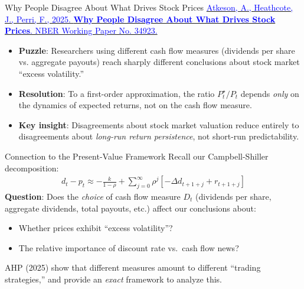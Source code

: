 \documentclass{beamer}
\begin{document}
\begin{frame}{Why People Disagree About What Drives Stock Prices}
	\href{https://www.nber.org/papers/w34923}{\textcolor{blue}{Atkeson, A., Heathcote, J., Perri, F., 2025. \textbf{Why People Disagree About What Drives Stock Prices}. NBER Working Paper No. 34923.}}
	\begin{itemize}
		\item \textbf{Puzzle}: Researchers using different cash flow measures (dividends per share vs. aggregate payouts) reach sharply different conclusions about stock market ``excess volatility.''
		\item \textbf{Resolution}: To a first-order approximation, the ratio $P^\star_t / P_t$ depends \textit{only} on the dynamics of expected returns, not on the cash flow measure.
		\item \textbf{Key insight}: Disagreements about stock market valuation reduce entirely to disagreements about \textit{long-run return persistence}, not short-run predictability.
	\end{itemize}
\end{frame}

\begin{frame}{Connection to the Present-Value Framework}
	Recall our Campbell-Shiller decomposition:
	\begin{align*}
		d_t - p_t \approx -\frac{k}{1-\rho} + \sum_{j=0}^{\infty} \rho^j \left[-\Delta d_{t+1+j} + r_{t+1+j}\right]
	\end{align*}
	\textbf{Question}: Does the \textit{choice} of cash flow measure $D_t$ (dividends per share, aggregate dividends, total payouts, etc.) affect our conclusions about:
	\begin{itemize}
		\item Whether prices exhibit ``excess volatility''?
		\item The relative importance of discount rate vs.\ cash flow news?
	\end{itemize}
	AHP (2025) show that different measures amount to different ``trading strategies,'' and provide an \textit{exact} framework to analyze this.
\end{frame}
\end{document}
